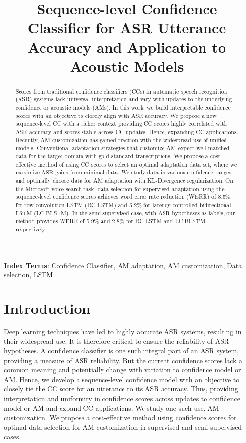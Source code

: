 \documentclass[a4paper]{article}
\title{Sequence-level Confidence Classifier for ASR Utterance Accuracy and Application to Acoustic Models}
\begin{document}
\maketitle
% 
\begin{abstract} %
Scores from traditional confidence classifiers (CCs) in automatic speech recognition (ASR) systems lack universal interpretation and vary with updates to the underlying confidence or acoustic models (AMs). In this work, we build interpretable confidence scores with an objective to closely align with ASR accuracy. We propose a new sequence-level CC with a richer context providing CC scores highly correlated with ASR accuracy and scores stable across CC updates. Hence, expanding CC applications. Recently, AM customization has gained traction with the widespread use of unified models. Conventional adaptation strategies that customize AM expect well-matched data for the target domain with gold-standard transcriptions. We propose a cost-effective method of using CC scores to select an optimal adaptation data set, where we maximize ASR gains from minimal data. We study data in various confidence ranges and optimally choose data for AM adaptation with KL-Divergence regularization. On the Microsoft voice search task, data selection for supervised adaptation using the sequence-level confidence scores achieves word error rate reduction (WERR) of 8.5\% for row-convolution LSTM (RC-LSTM) and 5.2\% for latency-controlled bidirectional LSTM (LC-BLSTM). In the semi-supervised case, with ASR hypotheses as labels, our method provides WERR of 5.9\% and 2.8\% for RC-LSTM and LC-BLSTM, respectively.
\end{abstract} 
\noindent\textbf{Index Terms}: Confidence Classifier, AM adaptation, AM customization,  Data selection, LSTM

\section{Introduction}\label{Sec:Introduction}
Deep learning techniques have led to highly accurate ASR systems, resulting in their widespread use. It is therefore critical to ensure the reliability of ASR hypotheses. A confidence classifier is one such integral part of an ASR system, providing a measure of ASR reliability. But the current confidence scores lack a common meaning and potentially change with variation to confidence model or AM. Hence, we develop a sequence-level confidence model with an objective to closely tie the CC score for an utterance to its ASR accuracy. Thus, providing interpretation and uniformity in confidence scores across updates to confidence model or AM and expand CC applications. We study one such use, AM customization. We propose a cost-effective method using confidence scores for optimal data selection for AM customization in supervised and semi-supervised cases.
\end{document}
